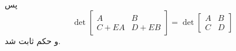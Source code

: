 \documentclass[12pt,a4paper]{article}
\begin{document}
پس
$$
\det \begin{bmatrix}A&B\\C+EA&D+EB\end{bmatrix} = \det \begin{bmatrix}A&B\\C&D\end{bmatrix}
$$
و حکم ثابت شد.
\end{document}

